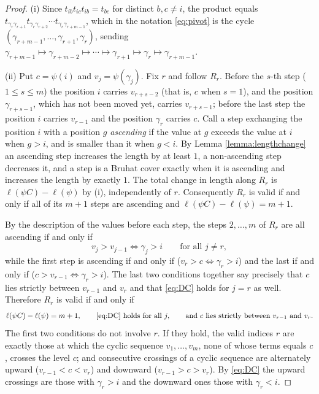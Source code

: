 \documentclass{amsart}
\theoremstyle{definition}
\theoremstyle{remark}
\numberwithin{equation}{section}
\begin{document}
\begin{proof}
(i) Since $t_{ib}t_{ic}t_{ib}=t_{bc}$ for distinct $b,c\neq i$, the product equals $t_{\gamma_r\gamma_{r+1}}t_{\gamma_r\gamma_{r+2}}\cdots t_{\gamma_r\gamma_{r+m-1}}$, which in the notation \eqref{eq:pivot} is the cycle $(\gamma_{r+m-1},\ldots,\gamma_{r+1},\gamma_r)$, sending $\gamma_{r+m-1}\mapsto\gamma_{r+m-2}\mapsto\cdots\mapsto\gamma_{r+1}\mapsto\gamma_r\mapsto\gamma_{r+m-1}$.

(ii) Put $c=\psi(i)$ and $v_j=\psi(\gamma_j)$. Fix $r$ and follow $R_r$. Before the $s$-th step ($1\leq s\leq m$) the position $i$ carries $v_{r+s-2}$ (that is, $c$ when $s=1$), and the position $\gamma_{r+s-1}$, which has not been moved yet, carries $v_{r+s-1}$; before the last step the position $i$ carries $v_{r-1}$ and the position $\gamma_r$ carries $c$. Call a step exchanging the position $i$ with a position $g$ \emph{ascending} if the value at $g$ exceeds the value at $i$ when $g>i$, and is smaller than it when $g<i$. By Lemma \ref{lemma:lengthchange} an ascending step increases the length by at least $1$, a non-ascending step decreases it, and a step is a Bruhat cover exactly when it is ascending and increases the length by exactly $1$. The total change in length along $R_r$ is $\ell(\psi C)-\ell(\psi)$ by (i), independently of $r$. Consequently $R_r$ is valid if and only if all of its $m+1$ steps are ascending and $\ell(\psi C)-\ell(\psi)=m+1$.

By the description of the values before each step, the steps $2,\ldots,m$ of $R_r$ are all ascending if and only if
\begin{equation}\label{eq:DC}
v_j>v_{j-1}\iff\gamma_j>i\qquad\text{for all }j\neq r,
\end{equation}
while the first step is ascending if and only if ($v_r>c\iff\gamma_r>i$) and the last if and only if ($c>v_{r-1}\iff\gamma_r>i$). The last two conditions together say precisely that $c$ lies strictly between $v_{r-1}$ and $v_r$ and that \eqref{eq:DC} holds for $j=r$ as well. Therefore $R_r$ is valid if and only if
$$\ell(\psi C)-\ell(\psi)=m+1,\qquad\text{\eqref{eq:DC} holds for all }j,\qquad\text{and }c\text{ lies strictly between }v_{r-1}\text{ and }v_r.$$
The first two conditions do not involve $r$. If they hold, the valid indices $r$ are exactly those at which the cyclic sequence $v_1,\ldots,v_m$, none of whose terms equals $c$, crosses the level $c$; and consecutive crossings of a cyclic sequence are alternately upward ($v_{r-1}<c<v_r$) and downward ($v_{r-1}>c>v_r$). By \eqref{eq:DC} the upward crossings are those with $\gamma_r>i$ and the downward ones those with $\gamma_r<i$.
\end{proof}
\end{document}
